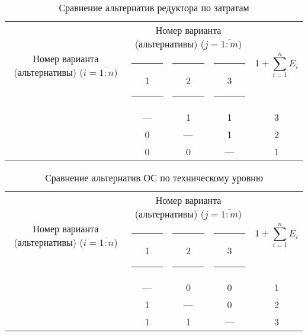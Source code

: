 \begin{table}[H]
    \centering
    \begin{tabular}{|c|c|c|c|c|}
        \hline
        \multirow{2}{2.4cm}[-0.5pc]{
            \centering
            Номер варианта (альтернативы) ($i = \overline{1:n}$)
        } &
        \multicolumn{3}{c|}{
            \parbox[t]{2.4cm}{
                \centering
                Номер варианта (альтернативы) ($j = \overline{1:m}$)
            }
        } &
        \multirow{2}{1.7cm}{
            \centering
            $$1 + \sum_{i=1}^n E_i$$
        } \\
        &
        \centering \rule{2pt}{0pt} 1 \rule{2pt}{0pt} &
        \centering \rule{2pt}{0pt} 2 \rule{2pt}{0pt} &
        \centering \rule{2pt}{0pt} 3 \rule{2pt}{0pt} & \\
        \hline \hline
        \centering{1} &---& 1 & 1 & 3 \\ \hline
        \centering{2} & 0 &---& 1 & 2 \\ \hline
        \centering{3} & 0 & 0 &---& 1 \\ \hline
    \end{tabular}
    \caption{Сравнение альтернатив редуктора по затратам}
    \label{tbl_red_cost_lvl_comparison}
\end{table}

\begin{table}[H]
    \centering
    \begin{tabular}{|c|c|c|c|c|}
        \hline
        \multirow{2}{2.4cm}[-0.5pc]{
            \centering
            Номер варианта (альтернативы) ($i = \overline{1:n}$)
        } &
        \multicolumn{3}{c|}{
            \parbox[t]{2.4cm}{
                \centering
                Номер варианта (альтернативы) ($j = \overline{1:m}$)
            }
        } &
        \multirow{2}{1.7cm}{
            \centering
            $$1 + \sum_{i=1}^n E_i$$
        } \\
        &
        \centering \rule{2pt}{0pt} 1 \rule{2pt}{0pt} &
        \centering \rule{2pt}{0pt} 2 \rule{2pt}{0pt} &
        \centering \rule{2pt}{0pt} 3 \rule{2pt}{0pt} & \\
        \hline \hline
        \centering{1} &---& 0 & 0 & 1 \\ \hline
        \centering{2} & 1 &---& 0 & 2 \\ \hline
        \centering{3} & 1 & 1 &---& 3 \\ \hline
    \end{tabular}
    \caption{Сравнение альтернатив ОС по техническому уровню}
    \label{tbl_os_tech_lvl_comparison}
\end{table}

